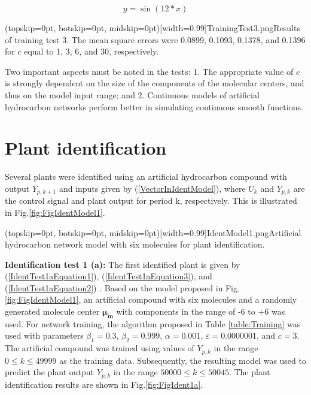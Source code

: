 \documentclass{ieeeaccess}
\begin{document}
\begin{equation}\label{TrainingTestEquation3}
y=\sin(12*x)
\end{equation}

\Figure[ht!](topskip=0pt, botskip=0pt, midskip=0pt)[width=0.99\columnwidth]{TrainingTest3.png}{Results of training test 3. The mean square errors were 0.0899, 0.1093, 0.1378, and 0.1396 for \(c\) equal to 1, 3, 6, and 30, respectively\label{fig:FigTrainingTest3}.}

Two important aspects must be noted in the tests: 1. The appropriate value of \(c\) is strongly dependent on the size of the components of the molecular centers, and thus on the model input range; and 2. Continuous models of artificial hydrocarbon networks perform better in simulating continuous smooth functions.

\section{Plant identification}
\label{sec:identification}

Several plants were identified using an artificial hydrocarbon compound with output \(Y_{p,k+1}\) and inputs given by (\ref{VectorInIdentModel}), where \(U_k\) and \(Y_{p,k}\) are the control signal and plant output for period k, respectively. This is illustrated in Fig.\ref{fig:FigIdentModel1}.

\Figure[ht!](topskip=0pt, botskip=0pt, midskip=0pt)[width=0.99\columnwidth]{IdentModel1.png}{Artificial hydrocarbon network model with six molecules for plant identification\label{fig:FigIdentModel1}.}

\textbf{Identification test 1 (a):} The first identified plant is given by (\ref{IdentTest1aEquation1}), (\ref{IdentTest1aEquation3}), and (\ref{IdentTest1aEquation2}) \cite{narendra_identification_1990}. Based on the model proposed in Fig.\ref{fig:FigIdentModel1}, an artificial compound with six molecules and a randomly generated molecule center \(\mathbf{\mu_m}\) with components in the range of -6 to +6 was used. For network training, the algorithm proposed in Table \ref{table:Training} was used with parameters \(\beta_1=0.3\), \(\beta_2=0.999\), \(\alpha=0.001\), \(\varepsilon=0.0000001\), and \(c=3\). The artificial compound was trained using values of \(Y_{p,k}\) in the range \(0\le k\le49999\) as the training data. Subsequently, the resulting model was used to predict the plant output \(Y_{p,k}\) in the range \(50000\le k\le50045\). The plant identification results are shown in Fig.\ref{fig:FigIdent1a}.
\end{document}
